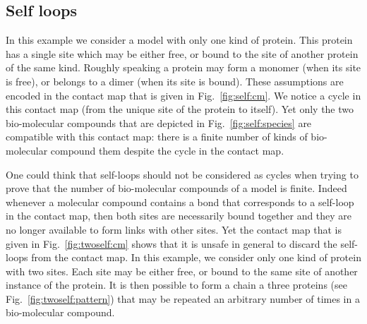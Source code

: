 \documentclass{entcs}
\begin{document}
\subsection{Self loops}
\label{sec:self-loop}
In this example we consider a model with only one kind of protein. This protein has a single site which may be either free, or bound to the site of another protein of the same kind. Roughly speaking a protein may form a monomer (when its site is free), or belongs to a dimer (when its site is bound). These assumptions are encoded in the contact map that is given in Fig.~\ref{fig:self:cm}. We notice a cycle in this contact map (from the unique site of the protein to itself). Yet only the two bio-molecular compounds that are depicted in Fig.~\ref{fig:self:species} are compatible with this contact map:  there is a finite number of kinds of bio-molecular compound them despite the cycle in the contact map.

One could think that self-loops should not be considered as cycles when trying to prove that the number of bio-molecular compounds of a model is finite. Indeed whenever a molecular compound contains a bond that corresponds to a self-loop in the contact map, then both sites are necessarily  bound together and they are no longer available to form links with other sites. Yet the contact map that is given in Fig.~\ref{fig:twoself:cm} shows that it is unsafe in general  to discard the self-loops from the contact map. In this example, we consider only one kind of protein with two sites. Each site may be either free, or bound to the same site of another instance of the protein. It is then possible to form a chain a three proteins (see Fig.~\ref{fig:twoself:pattern}) that may be repeated an arbitrary number of times in a bio-molecular compound.
\end{document}
